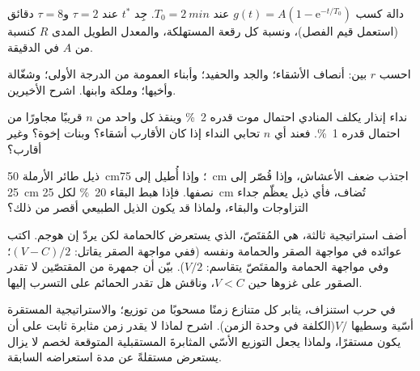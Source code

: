 \begin{exercise}[$\star\star$]\label{exo:b3:behavioural-ecology:6}
دالة كسب $g(t) = A(1 - \mathrm{e}^{-t/T_{0}})$ عند $T_{0} =
\qty{2}{min}$. جِد $t^{*}$ عند $\tau = 2$ و$\tau = 8$ دقائق (استعمل
قيم الفصل)، ونسبة كل رقعة المستهلكة، والمعدل الطويل المدى $R$
كنسبة من $A$ في الدقيقة.
\end{exercise}

\begin{exercise}[$\star\star$]\label{exo:b3:behavioural-ecology:7}
احسب $r$ بين: أنصاف الأشقاء؛ والجد والحفيد؛ وأبناء العمومة من
الدرجة الأولى؛ وشغّالة  وأخيها؛ وملكة
 وابنها. اشرح الأخيرين.
\end{exercise}

\begin{exercise}[$\star\star$]\label{exo:b3:behavioural-ecology:8}
نداء إنذار يكلف المنادي احتمال موت قدره \qty{2}{\%} وينقذ
كل واحد من $n$ قريبًا مجاورًا من احتمال قدره \qty{1}{\%}. فعند
أي $n$ تحابي  النداء إذا كان الأقارب أشقاء؟
وبنات إخوة؟ وغير أقارب؟
\end{exercise}

\begin{exercise}[$\star\star$]\label{exo:b3:behavioural-ecology:9}
ذيل طائر الأرملة \qty{50}{cm}؛ وإذا أُطيل إلى \qty{75}{cm}
اجتذب ضعف الأعشاش، وإذا قُصّر إلى \qty{25}{cm} نصفها. فإذا هبط
البقاء \qty{20}{\%} لكل \qty{25}{cm} تُضاف، فأي ذيل يعظّم
جداء التزاوجات والبقاء، ولماذا قد يكون الذيل الطبيعي أقصر
من ذلك؟
\end{exercise}

\begin{exercise}[$\star\star\star$]\label{exo:b3:behavioural-ecology:10}
أضف استراتيجية ثالثة، هي المُقتَصّ، الذي يستعرض كالحمامة لكن
يردّ إن هوجم. اكتب عوائده في مواجهة الصقر والحمامة
ونفسه (ففي مواجهة الصقر يقاتل: $(V - C)/2$؛ وفي مواجهة
الحمامة والمقتَصّ يتقاسم: $V/2$). بيّن أن جمهرة من المقتصّين
لا تقدر الصقور على غزوها حين $V < C$، وناقش هل تقدر الحمائم
على التسرب إليها.
\end{exercise}

\begin{exercise}[$\star\star\star$]\label{exo:b3:behavioural-ecology:11}
في حرب استنزاف، يثابر كل متنازع زمنًا مسحوبًا من
توزيع؛ والاستراتيجية المستقرة أسّية وسطيها $V/$(الكلفة في وحدة
الزمن). اشرح لماذا لا يقدر زمن مثابرة ثابت على أن يكون
مستقرًا، ولماذا يجعل التوزيع الأسّي المثابرةَ المستقبلية
المتوقعة لخصم لا يزال يستعرض مستقلةً عن مدة استعراضه
السابقة.
\end{exercise}

